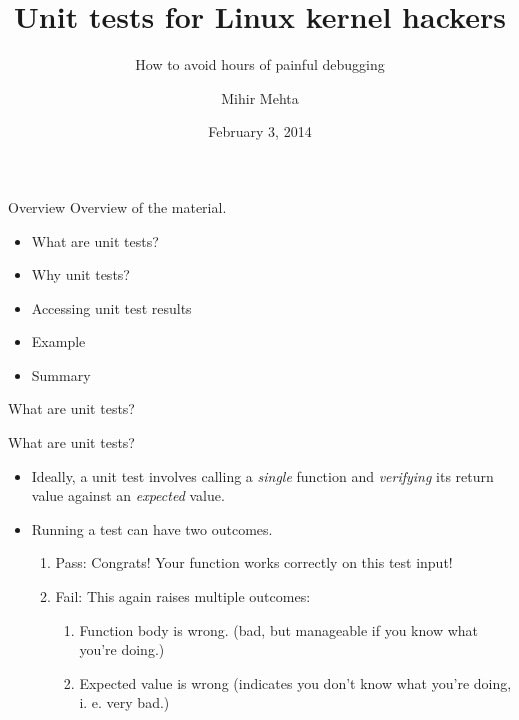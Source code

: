 \documentclass{beamer}
\title{Unit tests for Linux kernel hackers}
\subtitle{How to avoid hours of painful debugging}
\author{Mihir Mehta}
\institute{
  Systems Core Group\\
  Samsung Research Institute - Noida\\[1ex]
  \texttt{mihir.mehta@samsung.com}
}
\date{February 3, 2014}
\begin{document}
\begin{frame}[plain]
  \titlepage
\end{frame}

\begin{frame}{Overview}
  Overview of the material.
  \begin{itemize}

  \item What are unit tests?
  \item Why unit tests?
  \item Accessing unit test results
  \item Example
  \item Summary

  \end{itemize}
\end{frame}

\begin{frame}{What are unit tests?}

\end{frame}

\begin{frame}{What are unit tests?}

  \begin{itemize}

  \item Ideally, a unit test involves calling a \textit{single} function
    and \textit{verifying} its return value against an
    \textit{expected} value.
  \item Running a test can have two outcomes.
    \begin{enumerate}
    \item Pass: Congrats! Your function works correctly on this test
      input!
    \item Fail: This again raises multiple outcomes:
      \begin{enumerate}
      \item Function body is wrong. (bad, but manageable if you know
        what you're doing.)
      \item Expected value is wrong (indicates you don't know what
        you're doing, i. e. very bad.)
      \end{enumerate}
    \end{enumerate}

  \end{itemize}

\end{frame}
\end{document}
